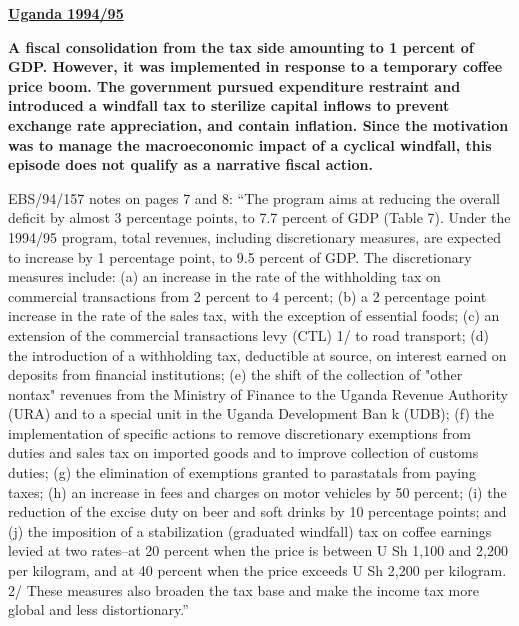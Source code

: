 \textbf{\underline{Uganda 1994/95}}

\textbf{A fiscal consolidation from the tax side amounting to 1 percent of GDP. However, it was implemented in response to a temporary coffee price boom. The government pursued expenditure restraint and introduced a windfall tax to sterilize capital inflows to prevent exchange rate appreciation, and contain inflation. Since the motivation was to manage the macroeconomic impact of a cyclical windfall, this episode does not qualify as a narrative fiscal action.} 

EBS/94/157 notes on pages 7 and 8: “The program aims at reducing the overall deficit by almost 3 percentage points, to 7.7 percent of GDP (Table 7). Under the 1994/95 program, total revenues, including discretionary measures, are expected to increase by 1 percentage point, to 9.5 percent of GDP. The discretionary measures include: (a) an increase in the rate of the withholding tax on commercial transactions from 2 percent to 4 percent; (b) a 2 percentage point increase in the rate of the sales tax, with the exception of essential foods; (c) an extension of the commercial transactions levy (CTL) 1/ to road transport; (d) the introduction of a withholding tax, deductible at source, on interest earned on deposits from financial institutions; (e) the shift of the collection of "other nontax" revenues from the Ministry of Finance to the Uganda Revenue Authority (URA) and to a special unit in the Uganda Development Ban k (UDB); (f) the implementation of specific actions to remove discretionary exemptions from duties and sales tax on imported goods and to improve collection of customs duties; (g) the elimination of exemptions granted to parastatals from paying taxes; (h) an increase in fees and charges on motor vehicles by 50 percent; (i) the reduction of the excise duty on beer and soft drinks by 10 percentage points; and (j) the imposition of a stabilization (graduated windfall) tax on coffee earnings levied at two rates--at 20 percent when the price is between U Sh 1,100 and 2,200 per kilogram, and at 40 percent when the price exceeds U Sh 2,200 per kilogram. 2/ These measures also broaden the tax base and make the income tax more global and less distortionary.”


